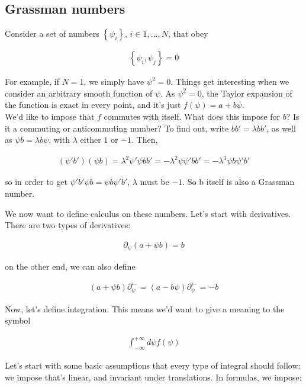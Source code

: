 \documentclass{report}
\begin{document}
\subsection{Grassman numbers}

Consider a set of numbers \(\left\{\psi_i \right\}, \, i \in 1, \ldots, N\), that obey 

\begin{align}
    \left\{\psi_i, \psi_j \right\} = 0 
\end{align}

For example, if \(N=1\), we simply have \(\psi^2 = 0\).
Things get interesting when we consider an arbitrary smooth function of \(\psi\). As \(\psi^2 = 0\), the Taylor expansion of the function is exact in every point, and it's just \(f(\psi) = a+b\psi\). \\

We'd like to impose that \(f\) commutes with itself. What does this impose for \(b\)? Is it a commuting or anticommuting number? To find out, write \(bb' = \lambda bb'\), as well as \(\psi b = \lambda b \psi\), with \(\lambda\) either \(1\) or \(-1\). Then, 

\begin{align}
    (\psi' b')(\psi b) = \lambda^2 \psi' \psi b b' = -\lambda^2 \psi \psi' b b' = -\lambda^3 \psi b \psi' b' 
\end{align}

so in order to get \(\psi' b' \psi b = \psi b \psi ' b'\), \(\lambda\) must be \(-1\). So b itself is also a Grassman number. 

We now want to define calculus on these numbers. Let's start with derivatives. There are two types of derivatives: 

\begin{align}
    \partial_\psi (a+ \psi b) = b 
\end{align}


on the other end, we can also define 

\begin{align}
    (a+ \psi b)\partial^\leftarrow_\psi = (a-  b \psi)\partial^\leftarrow_\psi = -b
\end{align}

Now, let's define integration. This means we'd want to give a meaning to the symbol 

\begin{align}
    \int_{-\infty}^{+\infty} d\psi f(\psi)
\end{align}

Let's start with some basic assumptions that every type of integral should follow: we impose that's linear, and invariant under translations. In formulas, we impose: 
\end{document}
